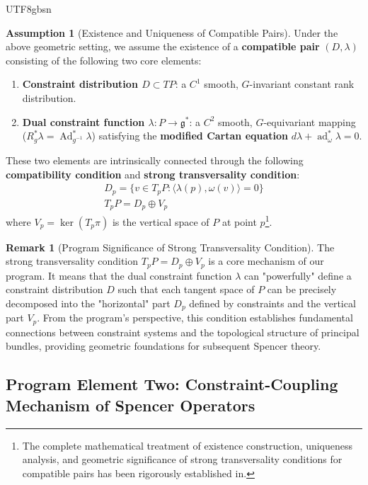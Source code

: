 \documentclass[a4paper,12pt]{extarticle}
\theoremstyle{definition}
\newtheorem{remark}{Remark}[section]
\newtheorem{assumption}{Assumption}[theorem]
\begin{document}
\begin{CJK}{UTF8}{gbsn}
\begin{assumption}[Existence and Uniqueness of Compatible Pairs]
\label{assumption:compatible_pair}
Under the above geometric setting, we assume the existence of a \textbf{compatible pair} $(D,\lambda)$ consisting of the following two core elements:
\begin{enumerate}
    \item \textbf{Constraint distribution $D \subset TP$}: a $C^1$ smooth, $G$-invariant constant rank distribution.
    \item \textbf{Dual constraint function $\lambda: P \to \mathfrak{g}^*$}: a $C^2$ smooth, $G$-equivariant mapping ($R_g^*\lambda = \operatorname{Ad}^*_{g^{-1}}\lambda$) satisfying the \textbf{modified Cartan equation} $d\lambda + \operatorname{ad}^*_\omega \lambda = 0$.
\end{enumerate}
These two elements are intrinsically connected through the following \textbf{compatibility condition} and \textbf{strong transversality condition}:
\begin{gather}
    \label{eq:compatibility_condition}
    D_p = \{v \in T_pP : \langle\lambda(p), \omega(v)\rangle = 0\} \\
    \label{eq:strong_transversality}
    T_pP = D_p \oplus V_p
\end{gather}
where $V_p = \ker(T_p\pi)$ is the vertical space of $P$ at point $p$\footnote{The complete mathematical treatment of existence construction, uniqueness analysis, and geometric significance of strong transversality conditions for compatible pairs has been rigorously established in\cite{zheng2025dynamical}.}.
\end{assumption}

\begin{remark}[Program Significance of Strong Transversality Condition]
\label{rem:stc_central_role}
The strong transversality condition $T_pP = D_p \oplus V_p$ is a core mechanism of our program. It means that the dual constraint function $\lambda$ can "powerfully" define a constraint distribution $D$ such that each tangent space of $P$ can be precisely decomposed into the "horizontal" part $D_p$ defined by constraints and the vertical part $V_p$. From the program's perspective, this condition establishes fundamental connections between constraint systems and the topological structure of principal bundles, providing geometric foundations for subsequent Spencer theory.
\end{remark}

\subsection{Program Element Two: Constraint-Coupling Mechanism of Spencer Operators}
\label{subsec:spencer_complex_evolution}


\end{CJK}
\end{document}
